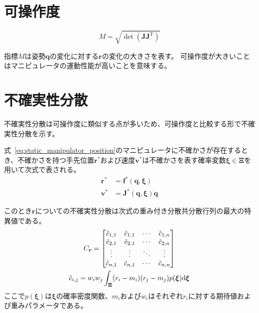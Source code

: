 \documentclass[10pt,a4j,twocolumn]{ltjsarticle}
\begin{document}
\section{可操作度}

\begin{equation}
  M = \sqrt{\det \left( \bm{J} \bm{J}^{\mathrm{T}} \right)}
\end{equation}

指標$M$は姿勢$\bm{q}$の変化に対する$\bm{r}$の変化の大きさを表す。
可操作度が大きいことはマニピュレータの運動性能が高いことを意味する。

\section{不確実性分散}

不確実性分散は可操作度に類似する点が多いため、可操作度と比較する形で不確実性分散を示す。

式~\eqref{eq:static_manipulator_position}のマニピュレータに不確かさが存在するとき、不確かさを持つ手先位置$\bm{r}^{*}$および速度$\bm{v}^{*}$は不確かさを表す確率変数$\bm{\xi} \in \bm{\Xi}$を用いて次式で表される。
\begin{align}
  \bm{r}^{*} &= \bm{f}^{*}(\bm{q}, \bm{\xi})              \\
  \bm{v}^{*} &= \bm{J}^{*}(\bm{q}, \bm{\xi}) \dot{\bm{q}}
\end{align}

このとき$\bm{r}$についての不確実性分散は次式の重み付き分散共分散行列の最大の特異値である。
\begin{gather}
  C_{\bm{r}} = \begin{bmatrix}
                 \tilde{c}_{1, 1} & \tilde{c}_{1, 1} & \cdots & \tilde{c}_{1, n} \\
                 \tilde{c}_{2, 1} & \tilde{c}_{2, 1} & \cdots & \tilde{c}_{2, n} \\
                 \vdots           & \vdots           & \ddots & \vdots           \\
                 \tilde{c}_{n, 1} & \tilde{c}_{n, 1} & \cdots & \tilde{c}_{n, n} \\
               \end{bmatrix} \\
  \tilde{c}_{i, j} = w_{i} w_{j} \int_{\bm{\Xi}} (r_{i} - m_{i})(r_{j} - m_{j}) p(\bm{\xi}) \mathrm{d}\bm{\xi} \notag
\end{gather}
ここで$p(\bm{\xi})$は$\bm{\xi}$の確率密度関数、$m_{i}$および$w_{i}$はそれぞれ$r_{i}$に対する期待値および重みパラメータである。
\end{document}
